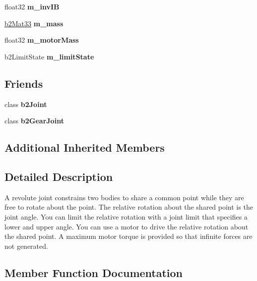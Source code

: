 \begin{DoxyCompactItemize}
float32 {\bfseries m\+\_\+inv\+IB}
\item 
\mbox{\label{classb2_revolute_joint_a284ae761074305d5032a2b666efb0650}} 
\hyperlink{structb2_mat33}{b2\+Mat33} {\bfseries m\+\_\+mass}
\item 
\mbox{\label{classb2_revolute_joint_aced7e455dd33ccb17a1d4ff9bb80c442}} 
float32 {\bfseries m\+\_\+motor\+Mass}
\item 
\mbox{\label{classb2_revolute_joint_abe77594f4773d21dabd8912d6630dc6a}} 
b2\+Limit\+State {\bfseries m\+\_\+limit\+State}
\end{DoxyCompactItemize}
\subsection*{Friends}
\begin{DoxyCompactItemize}
\item 
\mbox{\label{classb2_revolute_joint_a54ade8ed3d794298108d7f4c4e4793fa}} 
class {\bfseries b2\+Joint}
\item 
\mbox{\label{classb2_revolute_joint_a13c275221e30bb485e17e4e04553cb71}} 
class {\bfseries b2\+Gear\+Joint}
\end{DoxyCompactItemize}
\subsection*{Additional Inherited Members}


\subsection{Detailed Description}
A revolute joint constrains two bodies to share a common point while they are free to rotate about the point. The relative rotation about the shared point is the joint angle. You can limit the relative rotation with a joint limit that specifies a lower and upper angle. You can use a motor to drive the relative rotation about the shared point. A maximum motor torque is provided so that infinite forces are not generated. 

\subsection{Member Function Documentation}
\mbox{\label{classb2_revolute_joint_a5abafb4d0c1df642f73a5d9faf615e26}} 
